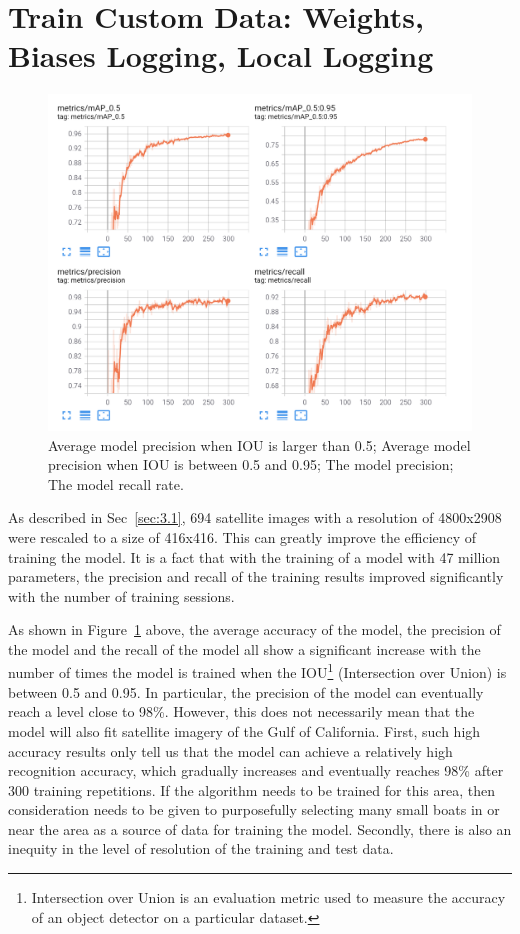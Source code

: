 \section{Train Custom Data: Weights, Biases Logging, Local Logging}

\begin{figure}[h]
    \centering
    \includegraphics[scale=0.43]{img/colab_metrics.png}
    \caption{Average model precision when IOU is larger than 0.5; Average model precision when IOU is between 0.5 and 0.95; The model precision; The model recall rate.}
    \label{fig:colab_metrics}
\end{figure}


As described in Sec~\ref{sec:3.1}, 694 satellite images with a resolution of 4800x2908 were rescaled to a size of 416x416. This can greatly improve the efficiency of training the model. It is a fact that with the training of a model with 47 million parameters, the precision and recall of the training results improved significantly with the number of training sessions.

As shown in Figure~\ref{fig:colab_metrics} above, the average accuracy of the model, the precision of the model and the recall of the model all show a significant increase with the number of times the model is trained when the IOU\footnote{Intersection over Union is an evaluation metric used to measure the accuracy of an object detector on a particular dataset.} (Intersection over Union) is between 0.5 and 0.95. In particular, the precision of the model can eventually reach a level close to 98\%. However, this does not necessarily mean that the model will also fit satellite imagery of the Gulf of California. First, such high accuracy results only tell us that the model can achieve a relatively high recognition accuracy, which gradually increases and eventually reaches 98\% after 300 training repetitions. If the algorithm needs to be trained for this area, then consideration needs to be given to purposefully selecting many small boats in or near the area as a source of data for training the model. Secondly, there is also an inequity in the level of resolution of the training and test data.

